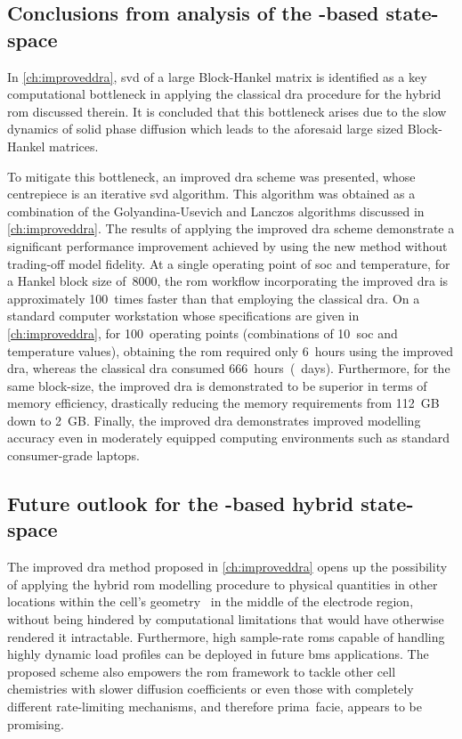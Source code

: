 \subsection{Conclusions from analysis of the -based state-space }

In \cref{ch:improveddra}, \gls{svd} of a large Block-Hankel matrix is identified
as a key computational bottleneck  in applying the classical \gls{dra} procedure
for the hybrid \gls{rom} discussed therein. It is concluded that this bottleneck
arises due  to the  slow dynamics of  solid phase diffusion  which leads  to the
aforesaid large sized Block-Hankel matrices.

To mitigate this  bottleneck, an improved \gls{dra} scheme  was presented, whose
centrepiece is an iterative \gls{svd}  algorithm. This algorithm was obtained as
a  combination of  the Golyandina-Usevich  and Lanczos  algorithms discussed  in
\cref{ch:improveddra}.  The results  of applying  the improved  \gls{dra} scheme
demonstrate  a significant  performance improvement  achieved by  using the  new
method  without trading-off  model  fidelity.  At a  single  operating point  of
\gls{soc}  and temperature,  for  a  Hankel block  size  of~8000, the  \gls{rom}
workflow incorporating the improved  \gls{dra} is approximately 100~times faster
than that employing the classical  \gls{dra}. On a standard computer workstation
whose  specifications  are  given in  \cref{ch:improveddra},  for  100~operating
points  (combinations of  10~\gls{soc}  and temperature  values), obtaining  the
\gls{rom}  required  only 6~hours  using  the  improved \gls{dra},  whereas  the
classical \gls{dra}  consumed 666~hours~(~days). Furthermore,  for the
same block-size, the improved \gls{dra} is  demonstrated to be superior in terms
of memory efficiency,  drastically reducing the memory  requirements from 112~GB
down to  2~GB. Finally, the  improved \gls{dra} demonstrates  improved modelling
accuracy even  in moderately  equipped computing  environments such  as standard
consumer-grade laptops.

\subsection{Future outlook for the -based hybrid state-space }

The improved  \gls{dra} method  proposed in  \cref{ch:improveddra} opens  up the
possibility of  applying the  hybrid \gls{rom}  modelling procedure  to physical
quantities in  other locations within the  cell's geometry \eg~in the  middle of
the electrode region,  without being hindered by  computational limitations that
would  have otherwise  rendered  it intractable.  Furthermore, high  sample-rate
\glspl{rom} capable of handling highly dynamic  load profiles can be deployed in
future \gls{bms} applications.  The proposed scheme also  empowers the \gls{rom}
framework to tackle other cell chemistries with slower diffusion coefficients or
even  those with  completely different  rate-limiting mechanisms,  and therefore
prima~facie, appears to be promising.

